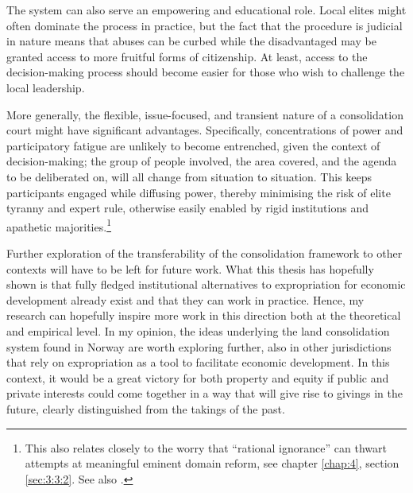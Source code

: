 
The system can also serve an empowering and educational role. Local elites might often dominate the process in practice, but the fact that the procedure is judicial in nature means that abuses can be curbed while the disadvantaged may be granted access to more fruitful forms of citizenship. At least, access to the decision-making process should become easier for those who wish to challenge the local leadership.

More generally, the flexible, issue-focused, and transient nature of a consolidation court might have significant advantages. Specifically, concentrations of power and participatory fatigue are unlikely to become entrenched, given the context of decision-making; the group of people involved, the area covered, and the agenda to be deliberated on, will all change from situation to situation. This keeps participants engaged while diffusing power, thereby minimising the risk of elite tyranny and expert rule, otherwise easily enabled by rigid institutions and apathetic majorities.\footnote{This also relates closely to the worry that ``rational ignorance'' can thwart attempts at meaningful eminent domain reform, see chapter \ref{chap:4}, section \ref{sec:3:3:2}. See also \cite{somin09}.}

Further exploration of the transferability of the consolidation framework to other contexts will have to be left for future work. What this thesis has hopefully shown is that fully fledged institutional alternatives to expropriation for economic development already exist and that they can work in practice. Hence, my research can hopefully inspire more work in this direction both at the theoretical and empirical level. In my opinion, the ideas underlying the land consolidation system found in Norway are worth exploring further, also in other jurisdictions that rely on expropriation as a tool to facilitate economic development. In this context, it would be a great victory for both property and equity if public and private interests could come together in a way that will give rise to givings in the future, clearly distinguished from the takings of the past.